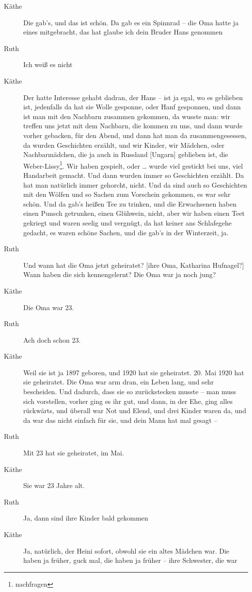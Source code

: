 \documentclass[ngerman,]{article}
\begin{document}
\begin{multicols}{3}
\begin{description}
\item[Käthe]
Die gab's, und das ist schön. Da gab es ein Spinnrad – die Oma hatte ja
eines mitgebracht, das hat glaube ich dein Bruder Hans genommen
\item[Ruth]
Ich weiß es nicht
\item[Käthe]
Der hatte Interesse gehabt dadran, der Hans – ist ja egal, wo es
geblieben ist, jedenfalls da hat sie Wolle gesponne, oder Hanf
gesponnen, und dann ist man mit den Nachbarn zusammen gekommen, da
wusste man: wir treffen uns jetzt mit dem Nachbarn, die kommen zu uns,
und dann wurde vorher gebacken, für den Abend, und dann hat man da
zusammengesessen, da wurden Geschichten erzählt, und wir Kinder, wir
Mädchen, oder Nachbarmädchen, die ja auch in Russland {[}Ungarn{]}
geblieben ist, die Weber-Lissy\footnote{nachfragen}. Wir haben gespielt,
oder \ldots{} wurde viel gestickt bei uns, viel Handarbeit gemacht. Und
dann wurden immer so Geschichten erzählt. Da hat man natürlich immer
gehorcht, nicht. Und da sind auch so Geschichten mit den Wölfen und so
Sachen zum Vorschein gekommen, es war sehr schön. Und da gab's heißen
Tee zu trinken, und die Erwachsenen haben einen Punsch getrunken, einen
Glühwein, nicht, aber wir haben einen Teet gekriegt und waren seelig und
vergnügt, da hat keiner ans Schlafegehe gedacht, es waren schöne Sachen,
und die gab's in der Winterzeit, ja.
\item[Ruth]
Und wann hat die Oma jetzt geheiratet? {[}ihre Oma, Katharina
Hufnagel?{]} Wann haben die sich kennengelernt? Die Oma war ja noch
jung?
\item[Käthe]
Die Oma war 23.
\item[Ruth]
Ach doch schon 23.
\item[Käthe]
Weil sie ist ja 1897 geboren, und 1920 hat sie geheiratet. 20. Mai 1920
hat sie geheiratet. Die Oma war arm dran, ein Leben lang, und sehr
bescheiden. Und dadurch, dass sie so zurückstecken musste – man muss
sich vorstellen, vorher ging es ihr gut, und dann, in der Ehe, ging
alles rückwärts, und überall war Not und Elend, und drei Kinder waren
da, und da war das nicht einfach für sie, und dein Mann hat mal gesagt –
\item[Ruth]
Mit 23 hat sie geheiratet, im Mai.
\item[Käthe]
Sie war 23 Jahre alt.
\item[Ruth]
Ja, dann sind ihre Kinder bald gekommen
\item[Käthe]
Ja, natürlich, der Heini sofort, obwohl sie ein altes Mädchen war. Die
haben ja früher, guck mal, die haben ja früher – ihre Schwester, die war

\end{description}
\end{multicols}
\end{document}
